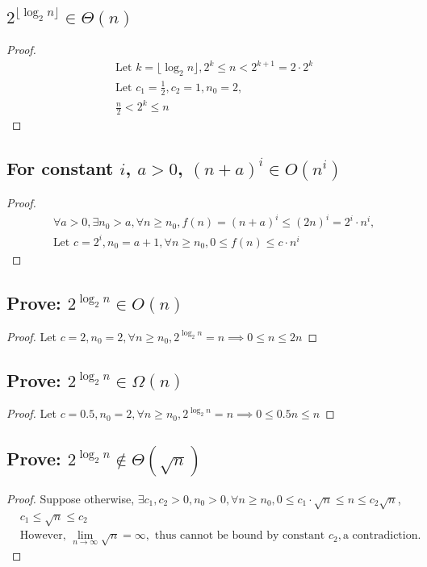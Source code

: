 \documentclass{article}
\begin{document}
\subsection*{$2^{\lfloor \log_2n \rfloor} \in \Theta(n)$}
\begin{proof}
    \begin{align*}
        & \text{Let } k = \lfloor \log_2 n\rfloor, 2^k \leq n < 2^{k+1} = 2 \cdot 2^k\\
        & \text{Let } c_1 = \frac{1}{2}, c_2 = 1, n_0 = 2, \\
        & \frac{n}{2} < 2^k \leq n
    \end{align*}
\end{proof}

\subsection*{For constant $i$, $a > 0$, $(n + a)^i \in O(n^i)$}
\begin{proof}
    \begin{align*}
        & \forall a > 0, \exists n_0 > a, \forall n \geq n_0, f(n) = (n + a)^i \leq (2n)^i = 2^i \cdot n^i, \\
        &\text{Let } c = 2^i, n_0 = a + 1, \forall n \geq n_0, 0 \leq f(n) \leq c \cdot n^i
    \end{align*}
\end{proof}
\subsection*{Prove: $2^{\log_2n} \in O(n)$}
\begin{proof}
    Let $c = 2, n_0 = 2, \forall n \geq n_0, 2^{\log_2n} = n \implies 0 \leq n \leq 2n$
\end{proof}
\subsection*{Prove: $2^{\log_2n} \in \Omega(n)$}
\begin{proof}
    Let $c = 0.5, n_0 = 2, \forall n \geq n_0, 2^{\log_2n} = n \implies 0 \leq 0.5n \leq n$
\end{proof}
\subsection*{Prove: $2^{\log_2n} \notin \Theta(\sqrt{n})$}
\begin{proof}
    Suppose otherwise, $\exists c_1, c_2 > 0, n_0 > 0, \forall n \geq n_0, 0 \leq c_1 \cdot \sqrt{n} \leq n \leq c_2 \sqrt{n}$,\\
    \begin{align*}
        & c_1 \leq \sqrt{n} \leq c_2\\
        & \text{However, } \lim_{n \rightarrow \infty} \sqrt{n}= \infty, \text{ thus cannot be bound by constant } c_2, \text{a contradiction.}
    \end{align*}
\end{proof}
\end{document}

